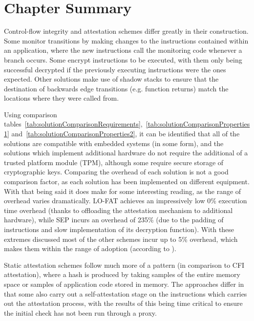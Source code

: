 \section{Chapter Summary}
Control-flow integrity and attestation schemes differ greatly in their construction. Some monitor transitions by making changes to the instructions contained within an application, where the new instructions call the monitoring code whenever a branch occurs. Some encrypt instructions to be executed, with them only being successful decrypted if the previously executing instructions were the ones expected. Other solutions make use of shadow stacks to ensure that the destination of backwards edge transitions (e.g. function returns) match the locations where they were called from.

Using comparison tables~\ref{tab:solutionComparisonRequirements},~\ref{tab:solutionComparisonProperties1} and~\ref{tab:solutionComparisonProperties2}, it can be identified that all of the solutions are compatible with embedded systems (in some form), and the solutions which implement additional hardware do not require the additional of a trusted platform module (TPM), although some require secure storage of cryptographic keys. Comparing the overhead of each solution is not a good comparison factor, as each solution has been implemented on different equipment. With that being said it does make for some interesting reading, as the range of overhead varies dramatically. LO-FAT achieves an impressively low 0\% execution time overhead (thanks to offloading the attestation mechanism to additional hardware), while SEP incurs an overhead of 235\% (due to the padding of instructions and slow implementation of its decryption function). With these extremes discussed most of the other schemes incur up to 5\% overhead, which makes them within the range of adoption (according to \cite{Szekeres2013}).

Static attestation schemes follow much more of a pattern (in comparison to CFI attestation), where a hash is produced by taking samples of the entire memory space or samples of application code stored in memory. The approaches differ in that some also carry out a self-attestation stage on the instructions which carries out the attestation process, with the results of this being time critical to ensure the initial check has not been run through a proxy.

 